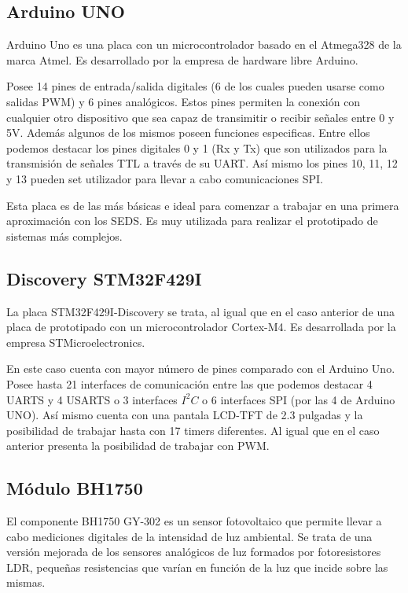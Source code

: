 \subsection{Arduino UNO}\label{subsec:arduino}
Arduino Uno es una placa con un microcontrolador basado en el
Atmega328 de la marca Atmel. Es desarrollado por la empresa de
hardware libre Arduino.

 Posee 14 pines de entrada/salida digitales (6 de los cuales
pueden usarse como salidas PWM) y 6 pines anal\'ogicos. Estos pines
permiten la conexi\'on con cualquier otro dispositivo que sea capaz de
transimitir o recibir se\~nales entre 0 y 5V. Adem\'as algunos de los
mismos poseen funciones especificas. Entre ellos podemos destacar 
los pines digitales 0 y 1 (Rx y Tx) que son utilizados para la transmisi\'on de
se\~nales TTL a trav\'es de su UART. As\'i mismo los pines 10, 11, 12 y
13 pueden set utilizador para llevar a cabo comunicaciones SPI.

Esta placa es de las m\'as b\'asicas e ideal para comenzar a trabajar
en una primera aproximaci\'on con los SEDS. Es muy utilizada para
realizar el prototipado de sistemas m\'as complejos.

\subsection{Discovery STM32F429I}\label{subsec:discovery}

La placa STM32F429I-Discovery se trata, al igual que en el caso
anterior de una placa de prototipado con un microcontrolador
Cortex-M4. Es desarrollada por la empresa STMicroelectronics. 

En este
caso cuenta con mayor n\'umero de pines comparado con el Arduino
Uno. Posee hasta 21 interfaces de comunicaci\'on entre las que podemos
destacar 4 UARTS y 4 USARTS o 3 interfaces $I^2C$ o 6 interfaces SPI
(por las 4 de Arduino UNO). As\'i mismo cuenta
con una pantala LCD-TFT de 2.3 pulgadas y la posibilidad de trabajar
hasta con 17 timers diferentes. Al igual que en el caso anterior
presenta la posibilidad de trabajar con PWM.

\subsection{M\'odulo BH1750}\label{subsec:bh1750}
El componente BH1750 GY-302 es un sensor fotovoltaico que permite
llevar a cabo mediciones digitales de la intensidad de luz
ambiental. Se trata de una versi\'on mejorada de los sensores
anal\'ogicos de luz formados por fotoresistores LDR, peque\~nas resistencias que
var\'ian en funci\'on de la luz que incide sobre las mismas.


